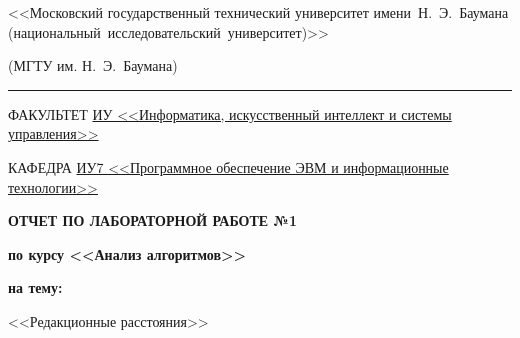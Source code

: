 \begin{titlepage}
\begin{center}
\begin{minipage}{0.85\textwidth}
{                    %
                    {<<Московский государственный технический университет имени~Н.~Э.~Баумана (национальный~исследовательский~университет)>>}

                    {(МГТУ им. Н.~Э.~Баумана)}
                    \vspace{0.1cm}
                }
            \end{minipage}

        \vspace{0.2cm}
        \rule{\linewidth}{2.8pt}

        \begin{flushleft}
            {ФАКУЛЬТЕТ \uline{ИУ <<Информатика, искусственный интеллект и системы управления>> \hfill}}

            \vspace{0.5cm}

            {КАФЕДРА \uline{ИУ7 <<Программное обеспечение ЭВМ и информационные технологии>> \hfill}}
        \end{flushleft}

        \vfill

        {
            \Large{\textbf{
                {ОТЧЕТ ПО ЛАБОРАТОРНОЙ РАБОТЕ №1}
            }}

            \Large{\textbf{
                {по курсу <<Анализ алгоритмов>>}
            }}

            \Large{\textbf{
                {на тему:}
            }}

            \large{<<Редакционные расстояния>>}

            \vspace{0.5cm}
        }

        \vspace{0.5cm}



\end{center}
\end{titlepage}
